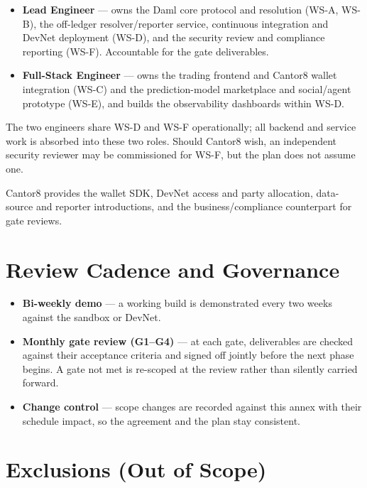 \documentclass[11pt,a4paper]{article}
\begin{document}
\begin{itemize}[leftmargin=2em, itemsep=2pt]
\item \textbf{Lead Engineer} --- owns the Daml core protocol and resolution (WS-A, WS-B), the off-ledger resolver/reporter service, continuous integration and DevNet deployment (WS-D), and the security review and compliance reporting (WS-F). Accountable for the gate deliverables.
\item \textbf{Full-Stack Engineer} --- owns the trading frontend and Cantor8 wallet integration (WS-C) and the prediction-model marketplace and social/agent prototype (WS-E), and builds the observability dashboards within WS-D.
\end{itemize}

The two engineers share WS-D and WS-F operationally; all backend and service work is absorbed into these two roles. Should Cantor8 wish, an independent security reviewer may be commissioned for WS-F, but the plan does not assume one.

Cantor8 provides the wallet SDK, DevNet access and party allocation, data-source and reporter introductions, and the business/compliance counterpart for gate reviews.

\section{Review Cadence and Governance}

\begin{itemize}[leftmargin=2em, itemsep=2pt]
\item \textbf{Bi-weekly demo} --- a working build is demonstrated every two weeks against the sandbox or DevNet.
\item \textbf{Monthly gate review (G1--G4)} --- at each gate, deliverables are checked against their acceptance criteria and signed off jointly before the next phase begins. A gate not met is re-scoped at the review rather than silently carried forward.
\item \textbf{Change control} --- scope changes are recorded against this annex with their schedule impact, so the agreement and the plan stay consistent.
\end{itemize}

\section{Exclusions (Out of Scope)}
\label{sec:exclusions}
\end{document}
